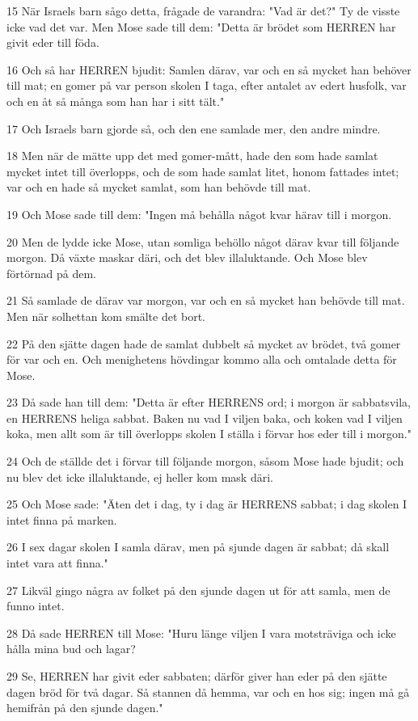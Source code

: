 \par 15 När Israels barn sågo detta, frågade de varandra: "Vad är det?" Ty de visste icke vad det var. Men Mose sade till dem: "Detta är brödet som HERREN har givit eder till föda.
\par 16 Och så har HERREN bjudit: Samlen därav, var och en så mycket han behöver till mat; en gomer på var person skolen I taga, efter antalet av edert husfolk, var och en åt så många som han har i sitt tält."
\par 17 Och Israels barn gjorde så, och den ene samlade mer, den andre mindre.
\par 18 Men när de mätte upp det med gomer-mått, hade den som hade samlat mycket intet till överlopps, och de som hade samlat litet, honom fattades intet; var och en hade så mycket samlat, som han behövde till mat.
\par 19 Och Mose sade till dem: "Ingen må behålla något kvar härav till i morgon.
\par 20 Men de lydde icke Mose, utan somliga behöllo något därav kvar till följande morgon. Då växte maskar däri, och det blev illaluktande. Och Mose blev förtörnad på dem.
\par 21 Så samlade de därav var morgon, var och en så mycket han behövde till mat. Men när solhettan kom smälte det bort.
\par 22 På den sjätte dagen hade de samlat dubbelt så mycket av brödet, två gomer för var och en. Och menighetens hövdingar kommo alla och omtalade detta för Mose.
\par 23 Då sade han till dem: "Detta är efter HERRENS ord; i morgon är sabbatsvila, en HERRENS heliga sabbat. Baken nu vad I viljen baka, och koken vad I viljen koka, men allt som är till överlopps skolen I ställa i förvar hos eder till i morgon."
\par 24 Och de ställde det i förvar till följande morgon, såsom Mose hade bjudit; och nu blev det icke illaluktande, ej heller kom mask däri.
\par 25 Och Mose sade: "Äten det i dag, ty i dag är HERRENS sabbat; i dag skolen I intet finna på marken.
\par 26 I sex dagar skolen I samla därav, men på sjunde dagen är sabbat; då skall intet vara att finna."
\par 27 Likväl gingo några av folket på den sjunde dagen ut för att samla, men de funno intet.
\par 28 Då sade HERREN till Mose: "Huru länge viljen I vara motsträviga och icke hålla mina bud och lagar?
\par 29 Se, HERREN har givit eder sabbaten; därför giver han eder på den sjätte dagen bröd för två dagar. Så stannen då hemma, var och en hos sig; ingen må gå hemifrån på den sjunde dagen."
